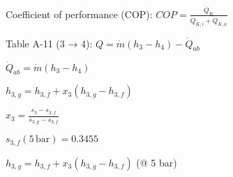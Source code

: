 Coefficient of performance (COP):  
\( COP = \frac{\dot{Q}_K}{\dot{Q}_{K,i} + \dot{Q}_{K,a}} \)  

Table A-11 (3 → 4):  
\( Q = \dot{m} (h_3 - h_4) - \dot{Q}_{ab} \)  

\( \dot{Q}_{ab} = \dot{m} (h_3 - h_4) \)  

\( h_{3,g} = h_{3,f} + x_3 (h_{3,g} - h_{3,f}) \)  

\( x_3 = \frac{s_3 - s_{3,f}}{s_{3,g} - s_{3,f}} \)  

\( s_{3,f} (5 \, \text{bar}) = 0.3455 \)  

\( h_{3,g} = h_{3,f} + x_3 (h_{3,g} - h_{3,f}) \) (@ 5 bar)